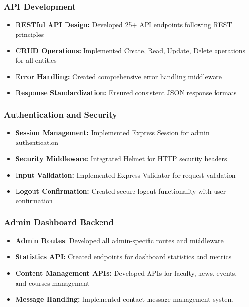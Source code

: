 \documentclass[12pt,a4paper]{report}
\begin{document}
\subsubsection{API Development}
\begin{itemize}
    \item \textbf{RESTful API Design:} Developed 25+ API endpoints following REST principles
    \item \textbf{CRUD Operations:} Implemented Create, Read, Update, Delete operations for all entities
    \item \textbf{Error Handling:} Created comprehensive error handling middleware
    \item \textbf{Response Standardization:} Ensured consistent JSON response formats
\end{itemize}

\subsubsection{Authentication and Security}
\begin{itemize}
    \item \textbf{Session Management:} Implemented Express Session for admin authentication
    \item \textbf{Security Middleware:} Integrated Helmet for HTTP security headers
    \item \textbf{Input Validation:} Implemented Express Validator for request validation
    \item \textbf{Logout Confirmation:} Created secure logout functionality with user confirmation
\end{itemize}

\subsubsection{Admin Dashboard Backend}
\begin{itemize}
    \item \textbf{Admin Routes:} Developed all admin-specific routes and middleware
    \item \textbf{Statistics API:} Created endpoints for dashboard statistics and metrics
    \item \textbf{Content Management APIs:} Developed APIs for faculty, news, events, and courses management
    \item \textbf{Message Handling:} Implemented contact message management system
\end{itemize}
\end{document}
